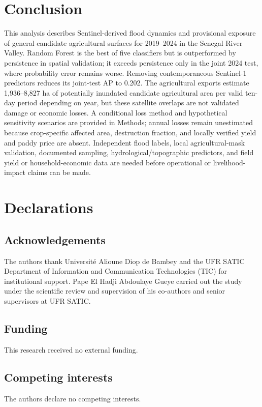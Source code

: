 \documentclass[pdflatex,sn-mathphys,Numbered]{sn-jnl}
\begin{document}
\section{Conclusion}
This analysis describes Sentinel-derived flood dynamics and provisional exposure of general candidate agricultural surfaces for 2019--2024 in the Senegal River Valley. Random Forest is the best of five classifiers but is outperformed by persistence in spatial validation; it exceeds persistence only in the joint 2024 test, where probability error remains worse. Removing contemporaneous Sentinel-1 predictors reduces its joint-test AP to 0.202. The agricultural exports estimate 1,936--8,827 ha of potentially inundated candidate agricultural area per valid ten-day period depending on year, but these satellite overlaps are not validated damage or economic losses. A conditional loss method and hypothetical sensitivity scenarios are provided in Methods; annual losses remain unestimated because crop-specific affected area, destruction fraction, and locally verified yield and paddy price are absent. Independent flood labels, local agricultural-mask validation, documented sampling, hydrological/topographic predictors, and field yield or household-economic data are needed before operational or livelihood-impact claims can be made.

\backmatter

\section*{Declarations}
\subsection*{Acknowledgements}
The authors thank Universit\'e Alioune Diop de Bambey and the UFR SATIC Department of Information and Communication Technologies (TIC) for institutional support. Pape El Hadji Abdoulaye Gueye carried out the study under the scientific review and supervision of his co-authors and senior supervisors at UFR SATIC.

\subsection*{Funding}
This research received no external funding.

\subsection*{Competing interests}
The authors declare no competing interests.
\end{document}

